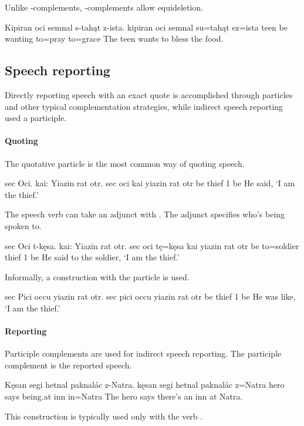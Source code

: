 Unlike -complements, -complements allow equideletion.

\begin{example}
    \script Kipiran oci semnal s-tahąt z-ista.
    \bits kipiran oci semnal su=tahąt ez=ista
    \gloss teen  be wanting to=pray to=grace
    \tr The teen wants to bless the food.
\end{example}

\subsection{Speech reporting}
Directly reporting speech with an exact quote is accomplished through particles and other typical complementation strategies, while indirect speech reporting used a participle.

\paragraph{Quoting}
The quotative particle  is the most common way of quoting speech.

\begin{example}
    \script sec Oci. kai: Yiazin rat otr.
    \bits sec oci kai yiazin rat otr
     be  thief 1 be
    \tr He said, `I am the thief.'
\end{example}

The speech verb can take an adjunct with . The adjunct specifies who's being spoken to.

\begin{example}
    \script sec Oci t-kęsa. kai: Yiazin rat otr.
    \bits sec oci tę=kęsa kai yiazin rat otr
     be to=soldier  thief 1 be
    \tr He said to the soldier, `I am the thief.'
\end{example}

Informally, a construction with the particle  is used.

\begin{example}
    \script sec Pici occu yiazin rat otr.
    \bits sec pici occu yiazin rat otr
     be  thief 1 be
    \tr He was like, `I am the thief.'
\end{example}

\paragraph{Reporting}
Participle complements are used for indirect speech reporting. The participle complement is the reported speech. 

\begin{example}
    \script Kęsan segi hetnal paknalác z-Natra.
    \bits kęsan segi  hetnal paknalác z=Natra
    \gloss hero  says  being.at inn in=Natra
    \tr The hero says there's an inn at Natra.
\end{example}

This construction is typically used only with the verb .